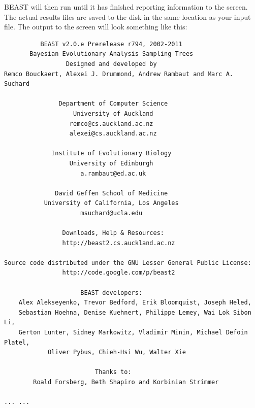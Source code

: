 \documentclass{article}
\begin{document}
BEAST will then run until it has finished
reporting information to the screen. The actual results files are
saved to the disk in the same location as your input file. The output to the screen will
look something like this: 

{\scriptsize   
\begin{verbatim}
          BEAST v2.0.e Prerelease r794, 2002-2011
       Bayesian Evolutionary Analysis Sampling Trees
                 Designed and developed by
Remco Bouckaert, Alexei J. Drummond, Andrew Rambaut and Marc A. Suchard
                              
               Department of Computer Science
                   University of Auckland
                  remco@cs.auckland.ac.nz
                  alexei@cs.auckland.ac.nz
                              
             Institute of Evolutionary Biology
                  University of Edinburgh
                     a.rambaut@ed.ac.uk
                              
              David Geffen School of Medicine
           University of California, Los Angeles
                     msuchard@ucla.edu
                              
                Downloads, Help & Resources:
              	http://beast2.cs.auckland.ac.nz
                              
Source code distributed under the GNU Lesser General Public License:
              	http://code.google.com/p/beast2
                              
                     BEAST developers:
	Alex Alekseyenko, Trevor Bedford, Erik Bloomquist, Joseph Heled, 
	Sebastian Hoehna, Denise Kuehnert, Philippe Lemey, Wai Lok Sibon Li, 
	Gerton Lunter, Sidney Markowitz, Vladimir Minin, Michael Defoin Platel, 
          	Oliver Pybus, Chieh-Hsi Wu, Walter Xie
                              
                         Thanks to:
    	Roald Forsberg, Beth Shapiro and Korbinian Strimmer

... ...



\end{verbatim}}
\end{document}

